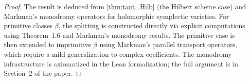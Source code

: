 \begin{proof}
  The result is deduced from \cref{thm:taut_Hilb} (the Hilbert scheme case)
  and Markman's monodromy operators for holomorphic symplectic varieties.
  For primitive classes \(\beta\), the splitting is constructed directly via
  explicit computations using Theorem~1.6 and Markman's monodromy results.
  The primitive case is then extended to imprimitive \(\beta\) using
  Markman's parallel transport operators, which require a mild generalization
  to complex coefficients.  The monodromy infrastructure is axiomatized in
  the Lean formalization; the full argument is in Section~2 of the paper.
\end{proof}
